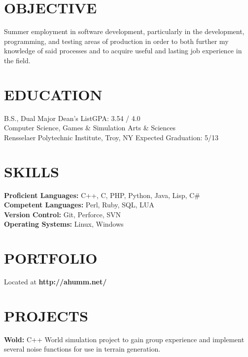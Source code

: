 \documentclass[margin,11pt]{res} %
\begin{document}

\address{{\bf Permanent Address} \\  9845 NE 27th st  \\ Bellevue, WA, 98004}
\address{ {\bf Contact Info} \\ talarsen@qwestoffice.net \\(425) 283-3847}

\begin{resume}
\section{OBJECTIVE}  
    Summer employment in software development, particularly in the development, programming, and testing areas of production in order to both further my knowledge of said processes and to acquire useful and lasting job experience in the field.

 
\section{EDUCATION}       B.S., Dual Major \hfill Dean's List\hfill GPA: 3.54 / 4.0 \\
                Computer Science, Games \& Simulation Arts \& Sciences  \\
                Rensselaer Polytechnic Institute, Troy, NY \hfill Expected Graduation: 5/13
 
\section{SKILLS}       {\bf Proficient Languages:} C++, C, PHP, Python, Java, Lisp, C\# \\
                {\bf Competent Languages:} Perl, Ruby, SQL, LUA \\
                {\bf Version Control:} Git, Perforce, SVN \\
                {\bf Operating Systems:} Linux, Windows
 
\section{PORTFOLIO}      {Located at {\bf http://ahumm.net/}}

\section{PROJECTS}
                {{\bf Wold:} C++ World simulation project to gain group experience and implement several noise functions for use in terrain generation.}


\end{resume}
\end{document}
